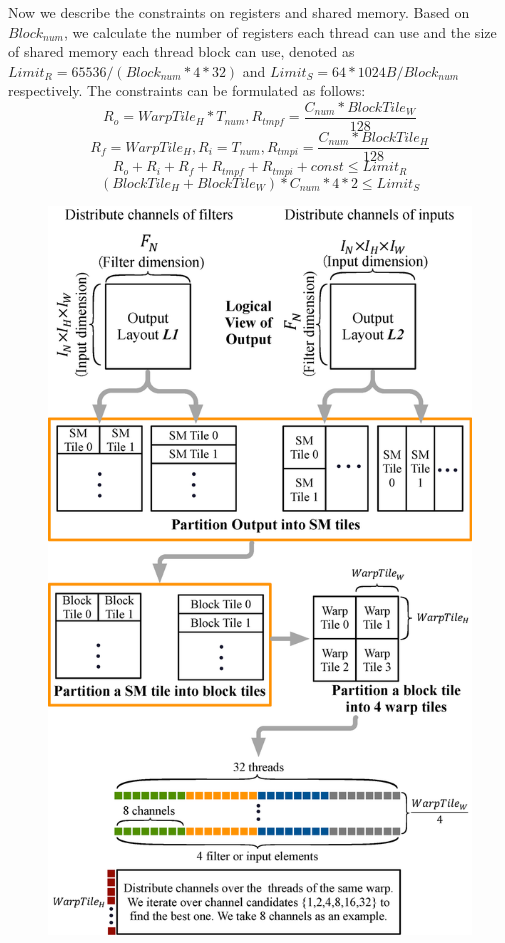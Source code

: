 Now we describe the constraints on registers and shared memory. Based on $Block_{num}$, we calculate the number of registers each thread can use and the size of shared memory each thread block can use, denoted as $Limit_R=65536/(Block_{num}*4*32)$ and $Limit_S=64*1024B/Block_{num}$ respectively.
The constraints can be formulated as follows:
\begin{equation}\nonumber
R_{o}=WarpTile_H*T_{num},R_{tmpf}=\frac{C_{num}*BlockTile_W}{128}
\end{equation}
\begin{equation}\nonumber
R_{f}=WarpTile_H,R_{i}=T_{num},R_{tmpi}=\frac{C_{num}*BlockTile_H}{128}
\end{equation}
\begin{equation}
R_{o}+R_{i}+R_{f}+R_{tmpf}+R_{tmpi}+const \leq Limit_R
\end{equation}
\begin{equation}
(BlockTile_H+BlockTile_W)*C_{num}*4*2 \leq Limit_S
\end{equation}
\begin{figure}
	\centering
    \includegraphics[width=\columnwidth]{./figure/pwworkflow.eps}
    \caption{} \label{fig:pwworkflow}
\end{figure}
